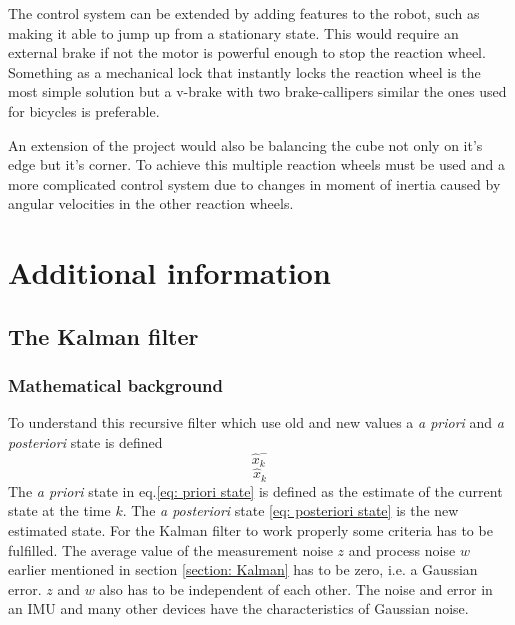 \documentclass[a4paper,11pt]{kth-mag}
\begin{document}
The control system can be extended by adding features to the robot, such as making it able to jump up from a stationary state. This would require an external brake if not the motor is powerful enough to stop the reaction wheel. Something as a mechanical lock that instantly locks the reaction wheel is the most simple solution but a v-brake with two brake-callipers similar the ones used for bicycles is preferable. 

An extension of the project would also be balancing the cube not only on it's edge but it's corner. To achieve this multiple reaction wheels must be used and a more complicated control system due to changes in moment of inertia caused by angular velocities in the other reaction wheels.


%
\cleardoublepage


\cleardoublepage
\appendix
{}


\chapter{Additional information} \label{appA}
\section{The Kalman filter} \label{app: Kalman}
\subsection{Mathematical background}
To understand this recursive filter which use old and new values a \textit{a priori} and \textit{a posteriori} state is defined
\begin{equation} \label{eq: priori state}
\hat{x}^-_k
\end{equation}
\begin{equation} \label{eq: posteriori state}
\hat{x}_k
\end{equation}
The \textit{a priori}  state in eq.\eqref{eq: priori state} is defined as the estimate of the current state at the time $k$. The \textit{a posteriori} state \eqref{eq: posteriori state} is the new estimated state.
For the Kalman filter to work properly some criteria has to be fulfilled. The average value of the measurement noise $z$ and process noise $w$ earlier mentioned in section \ref{section: Kalman} has to be zero, i.e. a Gaussian error. $z$ and $w$ also has to be independent of  each other. The noise and error in an IMU and many other devices have the characteristics of Gaussian noise.
\end{document}
